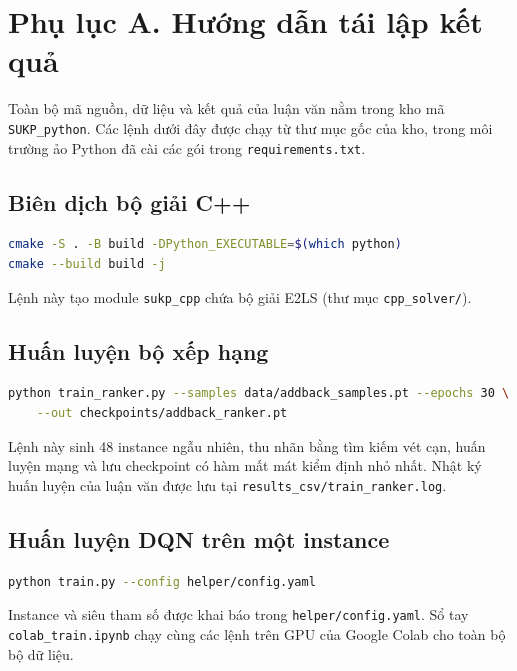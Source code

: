 \clearpage
\chapter*{Phụ lục A. Hướng dẫn tái lập kết quả}
\setcounter{chapter}{0}
\renewcommand{\thesection}{A.\arabic{section}}
\setcounter{section}{0}
\sloppy

Toàn bộ mã nguồn, dữ liệu và kết quả của luận văn nằm trong kho mã \texttt{SUKP\_python}. Các lệnh dưới đây được chạy từ thư mục gốc của kho, trong môi trường ảo Python đã cài các gói trong \texttt{requirements.txt}.

\section{Biên dịch bộ giải C++}

\begin{lstlisting}[language=bash]
cmake -S . -B build -DPython_EXECUTABLE=$(which python)
cmake --build build -j
\end{lstlisting}
Lệnh này tạo module \texttt{sukp\_cpp} chứa bộ giải E2LS (thư mục \texttt{cpp\_solver/}).

\section{Huấn luyện bộ xếp hạng}

\begin{lstlisting}[language=bash]
python train_ranker.py --samples data/addback_samples.pt --epochs 30 \
    --out checkpoints/addback_ranker.pt
\end{lstlisting}
Lệnh này sinh 48 instance ngẫu nhiên, thu nhãn bằng tìm kiếm vét cạn, huấn luyện mạng và lưu checkpoint có hàm mất mát kiểm định nhỏ nhất. Nhật ký huấn luyện của luận văn được lưu tại \texttt{results\_csv/train\_ranker.log}.

\section{Huấn luyện DQN trên một instance}

\begin{lstlisting}[language=bash]
python train.py --config helper/config.yaml
\end{lstlisting}
Instance và siêu tham số được khai báo trong \texttt{helper/config.yaml}. Sổ tay \texttt{colab\_train.ipynb} chạy cùng các lệnh trên GPU của Google Colab cho toàn bộ bộ dữ liệu.

